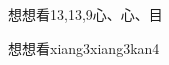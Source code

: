 \begin{entry}{想想看}{13,13,9}{⼼、⼼、⽬}
  \begin{phonetics}{想想看}{xiang3xiang3kan4}
  \end{phonetics}
\end{entry}
